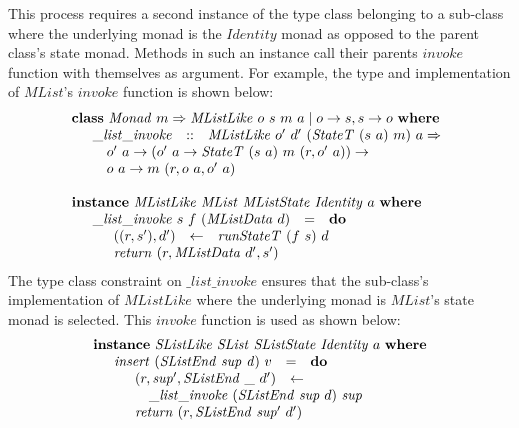 This process requires a second instance of the type class belonging to a sub-class where the underlying monad is the $\mathit{Identity}$ monad as opposed to the parent class's state monad. Methods in such an instance call their parents $\mathit{invoke}$ function with themselves as argument. For example, the type and implementation of $\mathit{MList}$'s $\mathit{invoke}$ function is shown below:
\begin{displaymath}
\begin{array}{l}
\mathbf{class}~\mathit{Monad}~m \Rightarrow \mathit{MListLike}~o~s~m~a \mid o \to s, s \to o~\mathbf{where} \\
\quad \begin{array}{lcl}
\_\mathit{list}\_\mathit{invoke} & :: & \mathit{MListLike}~o'~d'~(\mathit{StateT}~(s~a)~m)~a \Rightarrow\\
\multicolumn{3}{l}{\quad o'~a \to (o'~a \to \mathit{StateT}~(s~a)~m~(r,o'~a)) \to} \\
\multicolumn{3}{l}{\quad o~a \to m~(r,o~a,o'~a)}
\end{array} \\\\
\mathbf{instance}~\mathit{MListLike}~\mathit{MList}~\mathit{MListState}~\mathit{Identity}~a~\mathbf{where} \\
\quad \begin{array}{lcl}
\_\mathit{list}\_\mathit{invoke}~s~f~(\mathit{MListData}~d) & = & \mathbf{do} \\
\multicolumn{3}{l}{\quad \begin{array}{lcl}
    ((r,s'),d') & \leftarrow & \mathit{runStateT}~(f~s)~d \\
    \multicolumn{3}{l}{\mathit{return}~(r,\mathit{MListData}~d',s')}
    \end{array}}
\end{array}
\end{array}
\end{displaymath}
The type class constraint on $\_\mathit{list}\_\mathit{invoke}$ ensures that the sub-class's implementation of $\mathit{MListLike}$ where the underlying monad is $\mathit{MList}$'s state monad is selected. This $\mathit{invoke}$ function is used as shown below:
\begin{displaymath}
\begin{array}{l}
\mathbf{instance}~\mathit{SListLike}~\mathit{SList}~\mathit{SListState}~\mathit{Identity}~a~\mathbf{where} \\
\quad \begin{array}{lcl}
\mathit{insert}~(\mathit{SListEnd}~\mathit{sup}~\mathit{d})~v & = & \mathbf{do} \\
\multicolumn{3}{l}{\quad \begin{array}{lcl}
    (r,\mathit{sup}',\mathit{SListEnd}~\_~d') & \leftarrow & \\
    \multicolumn{3}{l}{\quad \_\mathit{list}\_\mathit{invoke}~(\mathit{SListEnd}~\mathit{sup}~d)~\mathit{sup}} \\
    \multicolumn{3}{l}{\mathit{return}~(r,\mathit{SListEnd}~\mathit{sup}'~d')}
    \end{array}}
\end{array}
\end{array}
\end{displaymath}

